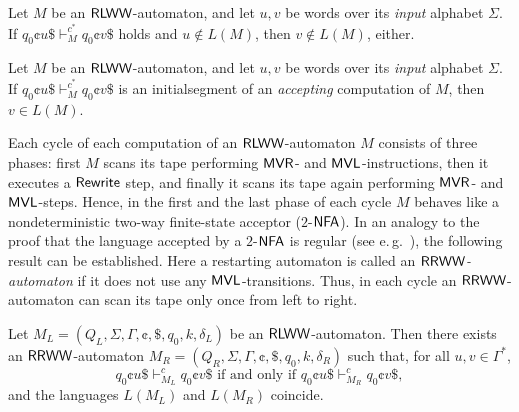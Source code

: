 \begin{proposition}\label{proposition:error-preserving-rlww}
Let $M$ be an $\textup{\sf RLWW}$-automaton, and let $u, v$ be words over its \emph{input} alphabet $\Sigma$. If $q_0 \cent u \$ \vdash_M^{c^*} q_0 \cent v \$$ holds and $u \notin L(M)$, then $v \notin L(M)$, either.
\end{proposition}

\begin{proposition}\label{proposition:correctness-preserving-rlww}
Let $M$ be an $\textup{\sf RLWW}$-automaton, and let $u, v$ be words over its \emph{input} alphabet $\Sigma$. If $q_0 \cent u \$ \vdash_M^{c^*} q_0 \cent v \$$ is an initialsegment of an \emph{accepting} computation of $M$, then $v \in L(M)$.
\end{proposition}

Each cycle of each computation of an $\textup{\sf RLWW}$-automaton $M$ consists of three phases: first $M$ scans its tape performing \index{$\MVR$}$\MVR$- and \index{$\MVL$}$\MVL$-instructions, then it executes a \index{$\Rewrite$}$\Rewrite$ step, and finally it scans its tape again performing \index{$\MVR$}$\MVR$- and \index{$\MVL$}$\MVL$-steps. Hence, in the first and the last phase of each cycle $M$ behaves like a nondeterministic two-way finite-state acceptor ($2$-$\textup{\sf NFA}$). In an analogy to the proof that the language accepted by a $2$-$\textup{\sf NFA}$ is regular (see e.\,g.\ \cite{HopcroftMotwaniUllman07}), the following result can be established. Here a restarting automaton is called an \emph{$\textup{\sf RRWW}$-automaton} if it does not use any \index{$\MVL$}$\MVL$-transitions. Thus, in each cycle an $\textup{\sf RRWW}$-automaton can scan its tape only once from left to right.

\begin{theorem}
Let $M_L = (Q_L, \Sigma, \Gamma, \cent, \$, q_0, k, \delta_L)$ be an $\textup{\sf RLWW}$-automaton. Then there exists an $\textup{\sf RRWW}$-automaton $M_R = (Q_R, \Sigma, \Gamma, \cent, \$, q_0, k, \delta_R)$ such that, for all $u, v \in \Gamma^*$, $$q_0 \cent u \$ \vdash_{M_L}^c q_0 \cent v \$ \text{ if and only if } q_0 \cent u \$ \vdash_{M_R}^c q_0 \cent v \$,$$ and the languages $L(M_L)$ and $L(M_R)$ coincide.
\end{theorem}

